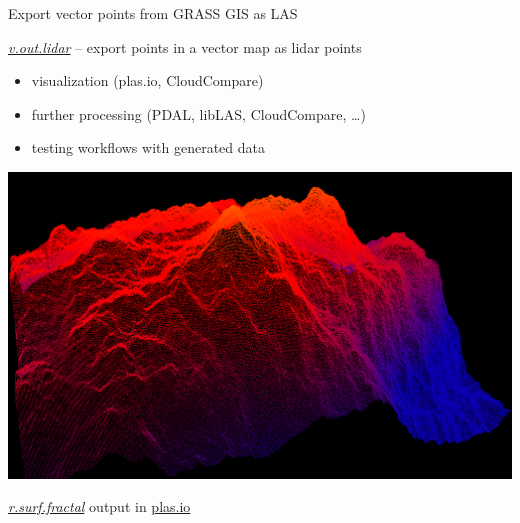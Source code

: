 \documentclass[xcolor={dvipsnames,usenames},beamer,aspectratio=169]{beamer}
\newcommand{\gmodule}[1]{\href{http://grass.osgeo.org/grass71/manuals/#1.html}{\emph{#1}}}
\newcommand{\module}[1]{\emph{#1}}
\begin{document}
\begin{frame}{Export vector points from GRASS GIS as LAS}

\gmodule{v.out.lidar} -- export points in a vector map as lidar points

\begin{itemize}
\item visualization (plas.io, CloudCompare)
\item further processing (PDAL, libLAS, CloudCompare, \ldots)
\item testing workflows with generated data
\end{itemize}

\begin{center}
\includegraphics[height=0.5\textheight]{images/features/fractals_plasio}

\gmodule{r.surf.fractal} output in \href{http://plas.io}{plas.io}
\end{center}


\end{frame}



\end{document}
